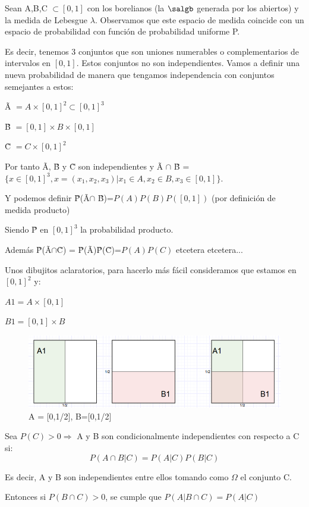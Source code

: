 \documentclass{apuntes}
\begin{document}
\begin{example}
Sean A,B,C $\subset [0,1]$ con los borelianos (la $\salgb$ generada por los abiertos) y la medida de Lebesgue $\lambda$. Observamos que este espacio de medida coincide con un espacio de probabilidad con función de probabilidad uniforme P.

Es decir, tenemos 3 conjuntos que son uniones numerables o complementarios de intervalos en $[0,1]$. Estos conjuntos no son independientes. Vamos a definir una nueva probabilidad de manera que tengamos independencia con conjuntos semejantes a estos:

\~{A} $= A\times[0,1]^2 \subset [0,1]^3$

\~{B} $= [0,1]\times B \times[0,1]$

\~{C} $= C \times[0,1]^2$

Por tanto \~{A}, \~{B} y \~{C} son independientes y \~{A} $\cap$ \~{B} = $\{x \in [0,1]^3, x=(x_1, x_2, x_3) | x_1 \in A, x_2 \in B, x_3 \in [0,1]\}$.

Y podemos definir \~{P}(\~{A}$\cap$ \~{B})=$P(A)P(B)P([0,1])$ (por definición de medida producto)

Siendo \~{P} en $[0,1]^3$ la probabilidad producto.

Además \~{P}(\~{A}$\cap$\~{C}) = \~{P}(\~{A})\~{P}(\~{C})=$P(A)P(C)$ etcetera etcetera...

Unos dibujitos aclaratorios, para hacerlo más fácil consideramos que estamos en $[0,1]^2$ y:

$A1 = A\times[0,1]$

$B1 = [0,1]\times B$

\begin{figure}[h]
\centering
\includegraphics[page=1,scale=0.545]{img/Dvenn3.png}
\caption{A = [0,1/2], B=[0,1/2]}
\end{figure}

\end{example}

\begin{defn} Sea $P(C)>0 \Rightarrow$ A y B son condicionalmente independientes con respecto a C si:
\[
P(A\cap B|C)=P(A|C)P(B|C)
\]

Es decir, A y B son independientes entre ellos tomando como $\Omega$ el conjunto C.

Entonces si $P(B\cap C)>0$, se cumple que $P(A|B\cap C)=P(A|C)$
\end{defn}
\end{document}
